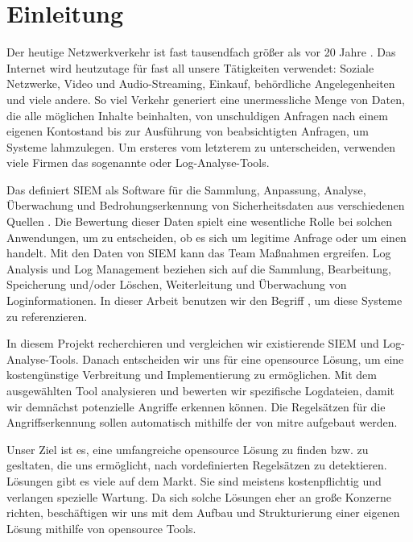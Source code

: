 \section{Einleitung}

Der heutige Netzwerkverkehr ist fast tausendfach größer als vor 20 Jahre \citep{Roser_I}. Das Internet wird heutzutage für fast all unsere Tätigkeiten verwendet: Soziale Netzwerke, Video und Audio-Streaming, Einkauf, behördliche Angelegenheiten und viele andere. So viel Verkehr generiert eine unermessliche Menge von Daten, die alle möglichen Inhalte beinhalten, von unschuldigen Anfragen nach einem eigenen Kontostand bis zur Ausführung von beabsichtigten Anfragen, um Systeme lahmzulegen. Um ersteres vom letzterem zu unterscheiden, verwenden viele Firmen das sogenannte  oder Log-Analyse-Tools. 

Das  definiert \gls{SIEM} als Software für die Sammlung, Anpassung, Analyse, Überwachung und Bedrohungserkennung von Sicherheitsdaten aus verschiedenen Quellen \citep{NIST_Definitions}. Die Bewertung dieser Daten spielt eine wesentliche Rolle bei solchen Anwendungen, um zu entscheiden, ob es sich um legitime Anfrage oder um einen  handelt. Mit den Daten von \gls{SIEM} kann das  Team Maßnahmen ergreifen. Log Analysis und Log Management beziehen sich auf die Sammlung, Bearbeitung, Speicherung und/oder Löschen, Weiterleitung und Überwachung von Loginformationen. In dieser Arbeit benutzen wir den Begriff , um diese Systeme zu referenzieren.

In diesem Projekt recherchieren und vergleichen wir existierende \gls{SIEM} und Log-Analyse-Tools. Danach entscheiden wir uns für eine \gls{opensource} Lösung, um eine kostengünstige Verbreitung und Implementierung zu ermöglichen. Mit dem ausgewählten Tool analysieren und bewerten wir spezifische Logdateien, damit wir demnächst potenzielle Angriffe erkennen können. Die Regelsätzen für die Angriffserkennung sollen automatisch mithilfe der  von \gls{mitre} aufgebaut werden.

\newpage
Unser Ziel ist es, eine umfangreiche \gls{opensource} Lösung zu finden bzw. zu gesltaten, die uns ermöglicht,  nach vordefinierten Regelsätzen zu detektieren.  Lösungen gibt es viele auf dem Markt. Sie sind meistens kostenpflichtig und verlangen spezielle Wartung. Da sich solche Lösungen eher an große Konzerne richten, beschäftigen wir uns mit dem Aufbau und Strukturierung einer eigenen Lösung mithilfe von \gls{opensource} Tools. 


